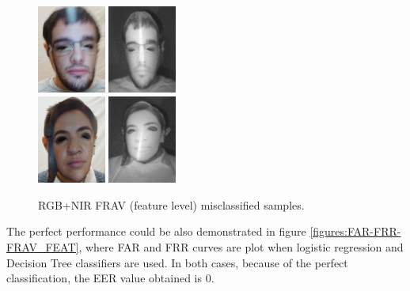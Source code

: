 \begin{figure}[htb]
\centering
\includegraphics[width=0.2\textwidth]{images_databases/frav_rgb_151.JPG}
\includegraphics[width=0.2\textwidth]{images_databases/frav_nir_151.jpg}
\\
\includegraphics[width=0.2\textwidth]{images_databases/frav_rgb_128.JPG}
\includegraphics[width=0.2\textwidth]{images_databases/frav_nir_128.jpg}
\caption{RGB+NIR FRAV (feature level) misclassified samples.} \label{fig:frav_feat_miscl}
\end{figure}

The perfect performance could be also demonstrated in figure \ref{figures:FAR-FRR-FRAV_FEAT}, where FAR and FRR curves are plot when logistic regression and Decision Tree classifiers are used. In both cases, because of the perfect classification, the EER value obtained is 0.

